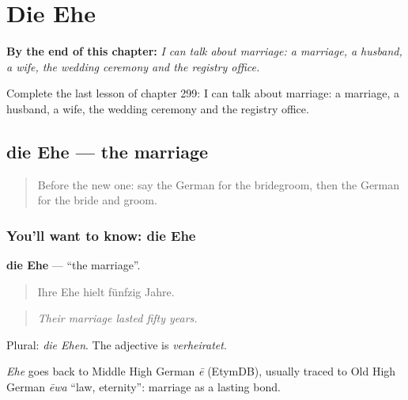 
\chapter{Die Ehe}
\label{ch:ge-die-ehe}

\begin{chapteropening}
\textbf{By the end of this chapter:} \emph{I can talk about marriage: a marriage, a husband, a wife, the wedding ceremony and the registry office.}

Complete the last lesson of chapter 299: I can talk about marriage: a marriage, a husband, a wife, the wedding ceremony and the registry office.
\end{chapteropening}

\section[die Ehe]{die Ehe — the marriage}

\label{lesson:GE-C299-ehe}



\begin{quote}
Before the new one: say the German for the bridegroom, then the German for the bride and groom.
\end{quote}

\subsection*{You'll want to know: die Ehe}
\textbf{die Ehe} — \textquotedblleft{}the marriage\textquotedblright{}.

\begin{quote}
Ihre Ehe hielt fünfzig Jahre.
\end{quote}

\begin{quote}
\emph{Their marriage lasted fifty years.}
\end{quote}

Plural: \emph{die Ehen}. The adjective is \emph{verheiratet}.

\begin{cousinweb}
\emph{Ehe} goes back to Middle High German \emph{ē} (EtymDB), usually traced to Old High German \emph{ēwa} \textquotedblleft{}law, eternity\textquotedblright{}: marriage as a lasting bond.
\end{cousinweb}

